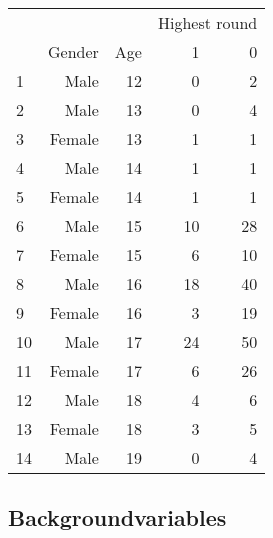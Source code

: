 \documentclass[C:/Users/sunpn505/Documents/studies/WinnerS/Erhebungen/IPhO1718/paper/problem_solving/main/main]{subfiles}
\begin{document}
\begin{table}
\centering
\begin{tabular}{lrrrr}
\toprule
  & & & \multicolumn{2}{c}{Highest round}\\
		\cmidrule(lr){4-5} 
 & Gender & Age & 1 & 0 \\ 
  \midrule
1 & Male & 12 &  0 &  2 \\ 
  2 & Male & 13 &  0 &  4 \\ 
  3 & Female & 13 &  1 &  1 \\ 
  4 & Male & 14 &  1 &  1 \\ 
  5 & Female & 14 &  1 &  1 \\ 
  6 & Male & 15 & 10 & 28 \\ 
  7 & Female & 15 &  6 & 10 \\ 
  8 & Male & 16 & 18 & 40 \\ 
  9 & Female & 16 &  3 & 19 \\ 
  10 & Male & 17 & 24 & 50 \\ 
  11 & Female & 17 &  6 & 26 \\ 
  12 & Male & 18 &  4 &  6 \\ 
  13 & Female & 18 &  3 &  5 \\ 
  14 & Male & 19 &  0 &  4 \\ 
   \bottomrule\end{tabular}
\end{table}


\subsection*{Backgroundvariables}
\end{document}

